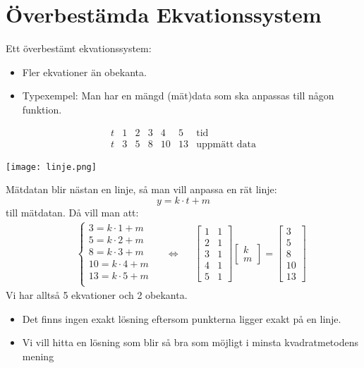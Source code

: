 \section{Överbestämda Ekvationssystem} %
\label{sec:_verbest_mda_ekvationssystem}
\begin{Def}
    Ett överbestämt ekvationssystem:
    \begin{itemize}
    	\item Fler ekvationer än obekanta.
    	\item Typexempel: Man har en mängd (mät)data som ska anpassas till någon funktion.
    \end{itemize}
\end{Def}
\begin{Ex}
\[
    \begin{array}{c|c|c|c|c|c|l}
    	t & 1 & 2 & 3 & 4 & 5 & \mbox{tid}\\
    	\hline
    	t & 3 & 5 & 8 & 10 & 13 & \mbox{uppmätt data}
    \end{array}
\]
\begin{center}
	\texttt{[image: linje.png]}	
\end{center}
Mätdatan blir nästan en linje, så man vill anpassa en rät linje:
\[
    y = k \cdot t + m
\]
till mätdatan. Då vill man att:
\begin{align*}
&&\begin{cases}
	3 = k \cdot 1 + m\\
	5 = k \cdot 2 + m\\
	8 = k \cdot 3 + m\\
	10 = k \cdot 4 + m\\
	13 = k \cdot 5 + m\\
\end{cases}
&&\Leftrightarrow
&&\begin{bmatrix} 1 & 1\\2 & 1\\3&1\\4&1\\5&1 \end{bmatrix}
\begin{bmatrix} k\\m \end{bmatrix} = 
\begin{bmatrix} 3\\5\\8\\10\\13 \end{bmatrix}
\end{align*}
Vi har alltså 5 ekvationer och 2 obekanta.
\begin{itemize}
	\item Det finns ingen exakt lösning eftersom punkterna ligger exakt på en linje.
	\item Vi vill hitta en lösning som blir så bra som möjligt i minsta kvadratmetodens mening
\end{itemize}
\end{Ex}
